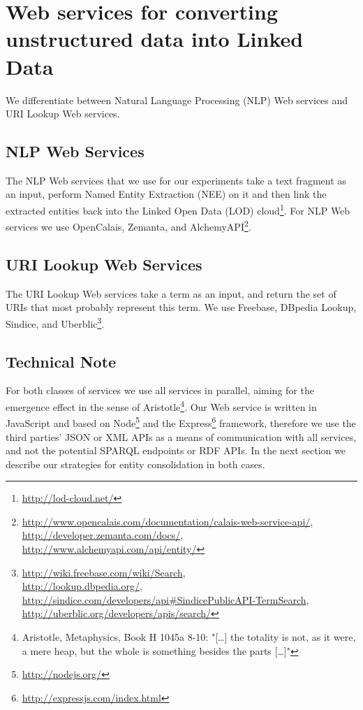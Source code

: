 \documentclass{acm_proc_article-sp}
\begin{document}
\section{Web services for converting unstructured data into Linked Data}\label{sec:services}
We differentiate between Natural Language Processing (NLP) Web services and URI Lookup Web services.
\subsection{NLP Web Services}\label{sec:nlp}
The NLP Web services that we use for our experiments take a text fragment as an input, perform Named Entity Extraction (NEE) on it and then link the extracted entities back into the Linked Open Data (LOD) cloud\footnote{\url{http://lod-cloud.net/}}. For NLP Web services we use OpenCalais, Zemanta, and AlchemyAPI\footnote{\url{http://www.opencalais.com/documentation/calais-web-service-api/},\\ \url{http://developer.zemanta.com/docs/},\\ \url{http://www.alchemyapi.com/api/entity/}}.

\subsection{URI Lookup Web Services}\label{sec:urilookup}
The URI Lookup Web services take a term as an input, and return the set of URIs that most probably represent this term. We use Freebase, DBpedia Lookup, Sindice, and Uberblic\footnote{\url{http://wiki.freebase.com/wiki/Search},\\ \url{http://lookup.dbpedia.org/},\\ \url{http://sindice.com/developers/api#SindicePublicAPI-TermSearch},\\ \url{http://uberblic.org/developers/apis/search/}}.

\subsection{Technical Note}\label{sec:technicalnote}
For both classes of services we use all services in parallel, aiming for the emergence effect in the sense of Aristotle\footnote{Aristotle, Metaphysics, Book H 1045a 8-10: "[\ldots] the totality is not, as it were, a mere heap, but the whole is something besides the parts [\ldots]"}. Our Web service is written in JavaScript and based on Node\footnote{\url{http://nodejs.org/}} and the Express\footnote{\url{http://expressjs.com/index.html}} framework, therefore we use the third parties' JSON or XML APIs as a means of communication with all services, and not the potential SPARQL endpoints or RDF APIs. In the next section we describe our strategies for entity consolidation in both cases. 
\end{document}

